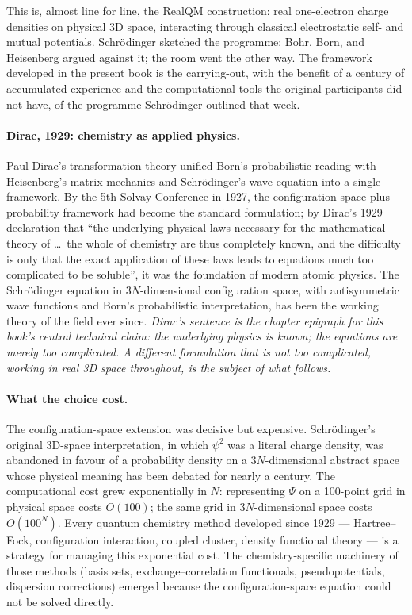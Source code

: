 This is, almost line for line, the RealQM construction: real one-electron charge densities on physical 3D space, interacting through classical electrostatic self- and mutual potentials. Schr\"odinger sketched the programme; Bohr, Born, and Heisenberg argued against it; the room went the other way. The framework developed in the present book is the carrying-out, with the benefit of a century of accumulated experience and the computational tools the original participants did not have, of the programme Schr\"odinger outlined that week.

\paragraph{Dirac, 1929: chemistry as applied physics.}
Paul Dirac's transformation theory unified Born's probabilistic reading with Heisenberg's matrix mechanics and Schr\"odinger's wave equation into a single framework. By the 5th Solvay Conference in 1927, the configuration-space-plus-probability framework had become the standard formulation; by Dirac's 1929 declaration that ``the underlying physical laws necessary for the mathematical theory of \ldots\ the whole of chemistry are thus completely known, and the difficulty is only that the exact application of these laws leads to equations much too complicated to be soluble'', it was the foundation of modern atomic physics. The Schr\"odinger equation in $3N$-dimensional configuration space, with antisymmetric wave functions and Born's probabilistic interpretation, has been the working theory of the field ever since. \emph{Dirac's sentence is the chapter epigraph for this book's central technical claim: the underlying physics is known; the equations are merely too complicated. A different formulation that is not too complicated, working in real 3D space throughout, is the subject of what follows.}

\paragraph{What the choice cost.}
The configuration-space extension was decisive but expensive. Schr\"odinger's original 3D-space interpretation, in which $\psi^2$ was a literal charge density, was abandoned in favour of a probability density on a $3N$-dimensional abstract space whose physical meaning has been debated for nearly a century. The computational cost grew exponentially in $N$: representing $\Psi$ on a 100-point grid in physical space costs $O(100)$; the same grid in $3N$-dimensional space costs $O(100^N)$. Every quantum chemistry method developed since 1929 --- Hartree--Fock, configuration interaction, coupled cluster, density functional theory --- is a strategy for managing this exponential cost. The chemistry-specific machinery of those methods (basis sets, exchange--correlation functionals, pseudopotentials, dispersion corrections) emerged because the configuration-space equation could not be solved directly.


